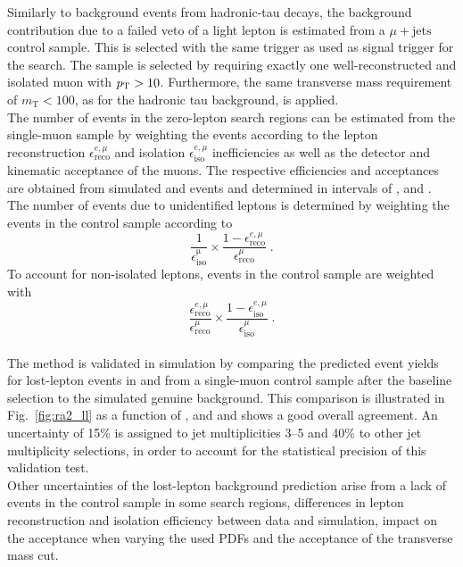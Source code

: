 Similarly to background events from hadronic-tau decays, the background contribution due to a failed veto of a light lepton is estimated from a $\mu + \mathrm{jets}$ control sample. This is selected with the same trigger as used as signal trigger for the search. The sample is selected by requiring exactly one well-reconstructed and isolated muon with $p_{\text{T}} > 10$\gev. Furthermore, the same transverse mass requirement of $m_\mathrm{T} < 100$\gev, as for the hadronic tau background, is applied. \\
The number of events in the zero-lepton search regions can be estimated from the single-muon sample by weighting the events according to the lepton reconstruction $\epsilon_\mathrm{reco}^{e, \mu}$ and isolation $\epsilon_\mathrm{iso}^{e, \mu}$ inefficiencies as well as the detector and kinematic acceptance of the muons. The respective efficiencies and acceptances are obtained from simulated \ttbar and \WJets events and determined in intervals of \HT, \MHT and \NJets. \\
The number of events due to unidentified leptons is determined by weighting the events in the control sample according to
\begin{equation*}
\frac{1}{\epsilon_\mathrm{iso}^\mathrm{\mu}} \times \frac{1-\epsilon_\mathrm{reco}^{e, \mu}}{\epsilon_\mathrm{reco}^{\mu}} \; .
\end{equation*}
To account for non-isolated leptons, events in the control sample are weighted with
\begin{equation*}
\frac{\epsilon_\mathrm{reco}^{e, \mu}}{\epsilon_\mathrm{reco}^{\mu}} \times \frac{1-\epsilon_\mathrm{iso}^{e, \mu}}{\epsilon_\mathrm{iso}^{\mu}} \; .
\end{equation*}
\\
The method is validated in simulation by comparing the predicted event yields for lost-lepton events in \ttbar and \WJets from a single-muon control sample after the baseline selection to the simulated genuine background. This comparison is illustrated in Fig.~\ref{fig:ra2_ll} as a function of \HT, \MHT and \NJets and shows a good overall agreement. An uncertainty of 15\% is assigned to jet multiplicities 3--5 and 40\% to other jet multiplicity selections, in order to account for the statistical precision of this validation test.\\
Other uncertainties of the lost-lepton background prediction arise from a lack of events in the control sample in some search regions, differences in lepton reconstruction and isolation efficiency between data and simulation, impact on the acceptance when varying the used PDFs and the acceptance of the transverse mass cut.

